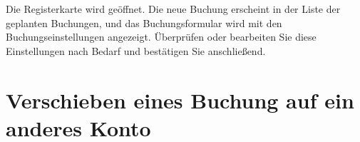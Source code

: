 Die Registerkarte  wird geöffnet. Die neue Buchung erscheint in der Liste der geplanten Buchungen, und das Buchungsformular wird mit den Buchungseinstellungen angezeigt. Überprüfen oder bearbeiten Sie diese Einstellungen nach Bedarf und bestätigen Sie anschließend.


\section{Verschieben eines Buchung auf ein anderes Konto\label{transactions-move}}


